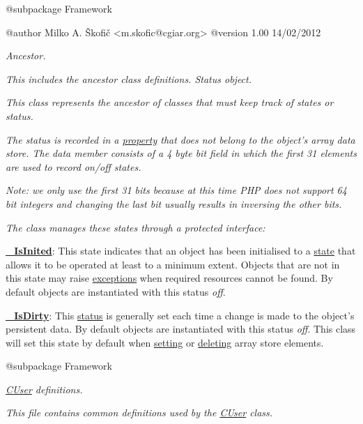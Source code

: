 {\itshape \begin{DoxyVerb} @subpackage        Framework

 @author            Milko A. Škofič <m.skofic@cgiar.org>
 @version   1.00 14/02/2012\end{DoxyVerb}
}

{\itshape Ancestor.}

{\itshape This includes the ancestor class definitions. Status object.}

{\itshape This class represents the ancestor of classes that must keep track of states or status.}

{\itshape The status is recorded in a \hyperlink{}{property} that does not belong to the object's array data store. The data member consists of a 4 byte bit field in which the first 31 elements are used to record on/off states.}

{\itshape {\itshape Note\-: we only use the first 31 bits because at this time P\-H\-P does not support 64 bit integers and changing the last bit usually results in inversing the other bits.}}

{\itshape The class manages these states through a protected interface\-:}

{\itshape 
\begin{DoxyItemize}
\item {\bfseries \hyperlink{}{\-\_\-\-Is\-Inited}}\-: This state indicates that an object has been initialised to a \hyperlink{}{state} that allows it to be operated at least to a minimum extent. Objects that are not in this state may raise \hyperlink{}{exceptions} when required resources cannot be found. By default objects are instantiated with this status {\itshape off}. 
\item {\bfseries \hyperlink{}{\-\_\-\-Is\-Dirty}}\-: This \hyperlink{}{status} is generally set each time a change is made to the object's persistent data. By default objects are instantiated with this status {\itshape off}. This class will set this state by default when \hyperlink{}{setting} or \hyperlink{}{deleting} array store elements. 
\end{DoxyItemize}}

{\itshape \begin{DoxyVerb} @subpackage        Framework\end{DoxyVerb}
}

{\itshape \hyperlink{class_c_user}{C\-User} definitions.}

{\itshape This file contains common definitions used by the \hyperlink{class_c_user}{C\-User} class.}

